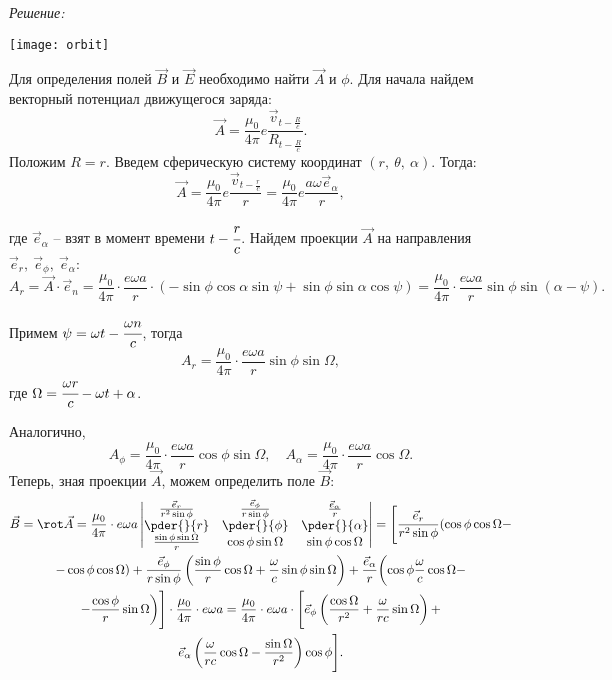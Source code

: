 \vspace*{2em}
\emph{Решение:}

\begin{minipage}{.45\textwidth}
    \texttt{[image: orbit]}
\end{minipage}
\begin{minipage}{.5\textwidth}
    Для определения полей \( \vec{B} \) и \( \vec{E} \) необходимо найти
    \( \vec{A} \) и \( \phi \). Для начала найдем векторный потенциал
    движущегося заряда:
    \[
        \vec{A} = \frac{\mu_0}{4\pi}e\frac{\vec{v}_{t - \frac{R}{c}}}{R_{t - \frac{R}{c}}}.
    \]
    Положим \( R = r \). Введем сферическую систему координат \( (r,\ \theta,\ 
    \alpha) \). Тогда:
    \[
        \vec{A} = \frac{\mu_0}{4\pi}e\frac{\vec{v}_{t - \frac{r}{c}}}{r} =
        \frac{\mu_0}{4\pi}e\frac{a\omega\vec{e}_\alpha}{r},
    \]
\end{minipage}
где \( \vec{e}_\alpha \) -- взят в момент времени \( t - \cfrac{r}{c} \). Найдем
проекции \( \vec{A} \) на направления \( \vec{e}_r,\ \vec{e}_\phi,\ 
\vec{e}_\alpha \):
\[
    A_r = \vec{A}\cdot\vec{e}_n = \frac{\mu_0}{4\pi}\cdot\frac{e\omega a}{r}
    \cdot(-\sin\phi\cos\alpha\sin\psi + \sin\phi\sin\alpha\cos\psi) =
    \frac{\mu_0}{4\pi}\cdot\frac{e\omega a}{r}\sin\phi\sin(\alpha - \psi).
\]

Примем \( \psi = \omega t - \cfrac{\omega n}{c} \), тогда
\[
    A_r = \frac{\mu_0}{4\pi}\cdot\frac{e\omega a}{r}\sin\phi\sin\Omega,
\]
где \( \Omega = \cfrac{\omega r}{c} - \omega t + \alpha \).

Аналогично,
\[
    A_\phi = \frac{\mu_0}{4\pi}\cdot\frac{e\omega a}{r}\cos\phi\sin\Omega, \quad
    A_\alpha = \frac{\mu_0}{4\pi}\cdot\frac{e\omega a}{r}\cos\Omega.
\]
Теперь, зная проекции \( \vec{A} \), можем определить поле \( \vec{B} \):
\begin{gather*}
    \vec{B} = \rot\vec{A} = \frac{\mu_0}{4\pi}\cdot e\omega a\begin{vmatrix}
    \frac{\vec{e}_r}{r^2\sin\phi} & \frac{\vec{e}_\phi}{r\sin\phi} &
    \frac{\vec{e}_\alpha}{r} \\ \pder{}{r} & \pder{}{\phi} & \pder{}{\alpha} \\
    \frac{\sin\phi\sin\Omega}{r} & \cos\phi\sin\Omega & \sin\phi\cos\Omega
    \end{vmatrix} = \Biggl[\frac{\vec{e}_r}{r^2\sin\phi}(\cos\phi\cos\Omega - \\
    -\cos\phi\cos\Omega) + \frac{\vec{e}_\phi}{r\sin\phi}\left(\frac{\sin\phi}
    {r}\cos\Omega + \frac{\omega}{c}\sin\phi\sin\Omega\right) +
    \frac{\vec{e}_\alpha}{r}\biggl(\cos\phi\frac{\omega}{c}\cos\Omega - \\
    - \frac{\cos\phi}{r}\sin\Omega\biggr)\Biggr]\cdot\frac{\mu_0}{4\pi}\cdot e
    \omega a = \frac{\mu_0}{4\pi}\cdot e\omega a\cdot\Biggl[\vec{e}_\phi\left(
    \frac{\cos\Omega}{r^2} + \frac{\omega}{rc}\sin\Omega\right) + \\
    \vec{e}_\alpha\left(\frac{\omega}{rc}\cos\Omega - \frac{\sin\Omega}{r^2}
    \right)\cos\phi\Biggr].
\end{gather*}

